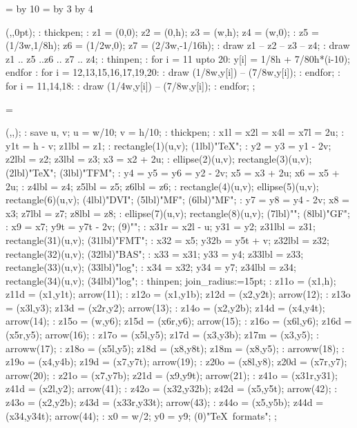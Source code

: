 
=\hsize \divide{} by 10
= \divide{} by 3 \multiply{} by 4

\MTbeginchar(\the{},\the{},0pt);
\MT: thickpen;
\MT: z1 = (0,0); z2 = (0,h); z3 = (w,h); z4 = (w,0);
\MT: z5 = (1/3w,1/8h); z6 = (1/2w,0); z7 = (2/3w,-1/16h);
\MT: draw z1 -- z2 -- z3 -- z4;
\MT: draw z1 .. z5 ..z6 .. z7 .. z4;
\MT: thinpen;
\MT: for i = 11 upto 20: y[i] = 1/8h + 7/80h*(i-10); endfor
\MT: for i = 12,13,15,16,17,19,20:
\MT:  draw (1/8w,y[i]) -- (7/8w,y[i]);
\MT: endfor;
\MT: for i = 11,14,18:
\MT:  draw (1/4w,y[i]) -- (7/8w,y[i]);
\MT: endfor;
\MTendchar;

=\box\MTbox

\ifdim\hsize<10cm
 \let\figfont=\smallsf \def\driver{drv}
 \dimen0=\hsize \multiply\dimen0 by 2 \divide\dimen0 by 3
\else
 \let\figfont=\sf \def\driver{Driver}
 \dimen0=\hsize \multiply\dimen0 by 2 \divide\dimen0 by 4
\fi

\MTbeginchar(\the\hsize,\the{},\the{});
\MT: save u, v; u = w/10; v = h/10;
\MT: thickpen;
\MT: x1l = x2l = x4l = x7l = 2u;
\MT: y1t = h - v; z1lbl = z1;
\MT: rectangle(1)(u,v);
\MTlabel(1lbl)"\figfont\TeX";
\MT: y2 = y3 = y1 - 2v; z2lbl = z2; z3lbl = z3; x3 = x2 + 2u;
\MT: ellipse(2)(u,v); rectangle(3)(u,v);
\MTlabel(2lbl)"\figfont\TeX"; \MTlabel(3lbl)"\figfont TFM";
\MT: y4 = y5 = y6 = y2 - 2v; x5 = x3 + 2u; x6 = x5 + 2u;
\MT: z4lbl = z4; z5lbl = z5; z6lbl = z6;
\MT: rectangle(4)(u,v); ellipse(5)(u,v); rectangle(6)(u,v);
\MTlabel(4lbl)"\figfont DVI"; \MTlabel(5lbl)"\figfont MF";
\MTlabel(6lbl)"\figfont MF";
\MT: y7 = y8 = y4 - 2v; x8 = x3; z7lbl = z7; z8lbl = z8;
\MT: ellipse(7)(u,v); rectangle(8)(u,v);
\MTlabel(7lbl)"\figfont\driver"; \MTlabel(8lbl)"\figfont GF";
\MT: x9 = x7; y9t = y7t - 2v;
\MTlabel(9)"";
\MT: x31r = x2l - u; y31 = y2; z31lbl = z31; rectangle(31)(u,v);
\MTlabel(31lbl)"\figfont FMT";
\MT: x32 = x5; y32b = y5t + v; z32lbl = z32; rectangle(32)(u,v);
\MTlabel(32lbl)"\figfont BAS";
\MT: x33 = x31; y33 = y4; z33lbl = z33; rectangle(33)(u,v);
\MTlabel(33lbl)"\figfont log";
\MT: x34 = x32; y34 = y7; z34lbl = z34; rectangle(34)(u,v);
\MTlabel(34lbl)"\figfont log";
\MT: thinpen; join_radius:=15pt;
\MT: z11o = (x1,h); z11d = (x1,y1t); arrow(11);
\MT: z12o = (x1,y1b); z12d = (x2,y2t); arrow(12);
\MT: z13o = (x3l,y3); z13d = (x2r,y2); arrow(13);
\MT: z14o = (x2,y2b); z14d = (x4,y4t); arrow(14);
\MT: z15o = (w,y6); z15d = (x6r,y6); arrow(15);
\MT: z16o = (x6l,y6); z16d = (x5r,y5); arrow(16);
\MT: z17o = (x5l,y5); z17d = (x3,y3b); z17m = (x3,y5);
\MT: arroww(17);
\MT: z18o = (x5l,y5); z18d = (x8,y8t); z18m = (x8,y5);
\MT: arroww(18);
\MT: z19o = (x4,y4b); z19d = (x7,y7t); arrow(19);
\MT: z20o = (x8l,y8); z20d = (x7r,y7); arrow(20);
\MT: z21o = (x7,y7b); z21d = (x9,y9t); arrow(21);
\MT: z41o = (x31r,y31); z41d = (x2l,y2); arrow(41);
\MT: z42o = (x32,y32b); z42d = (x5,y5t); arrow(42);
\MT: z43o = (x2,y2b); z43d = (x33r,y33t); arrow(43);
\MT: z44o = (x5,y5b); z44d = (x34,y34t); arrow(44);
\MT: x0 = w/2; y0 = y9; %
\MTlabel(0)"\rm \TeX\ formats";
\MTendchar;

\centerline{\box\MTbox}
